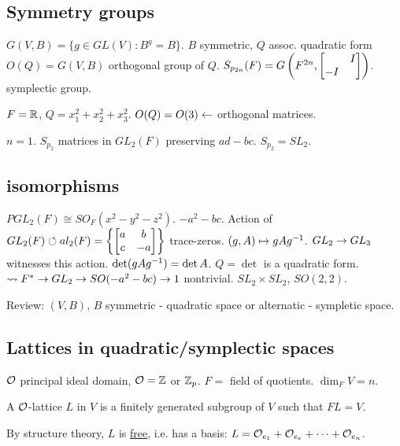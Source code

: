 \documentclass[]{article}
\begin{document}
\subsection*{Symmetry groups}

$G(V,B) = \{g\in GL(V): B^g = B\}$. $B$ symmetric, $Q$ assoc. quadratic form $O(Q) = G(V,B)$ orthogonal group of $Q$. $S_{p_{2n}}(F) = G\left(F^{2n},\begin{bmatrix}&I\\-I&\end{bmatrix}\right)$. symplectic group.

\begin{example}
	$F = \mathbb{R}$, $Q = x_1^2 + x_2^2 + x_3^2$. $O(Q) = O(3) \leftarrow$ orthogonal matrices.
\end{example}
\begin{example}
	$n = 1$. $S_{p_2}$ matrices in $GL_2(F)$ preserving $ad-bc$. $S_{p_2} = SL_2$.
\end{example}
\subsection*{ isomorphisms}

$PGL_2(F) \cong SO_F(x^2-y^2-z^2)$. $-a^2-bc$. Action of $GL_2(F) \circlearrowleft al_2(F) = \left\{\begin{bmatrix}a&b\\c&-a\end{bmatrix}\right\}$ trace-zeros. $(g,A) \mapsto gAg^{-1}$. $GL_2\rightarrow GL_3$ witnesses this action. $\det(gAg^{-1}) = \det A$. $Q = \det$ is a quadratic form. $\rightsquigarrow F^* \rightarrow GL_2 \rightarrow SO(-a^2-bc) \rightarrow 1$ nontrivial.
$SL_2\times SL_2$, $SO(2,2)$.


Review: $(V,B)$, $B$ symmetric - quadratic space or alternatic - sympletic space.

\subsection*{Lattices in quadratic/symplectic spaces}

$\mathcal{O}$ principal ideal domain, $\mathcal{O} = \mathbb{Z}$ or $\mathbb{Z}_p$. $F = $ field of quotients. $\dim_F V = n$.

\begin{definition}
	A $\mathcal{O}$-lattice $L$ in $V$ is a finitely generated subgroup of $V$ such that $FL = V$.
\end{definition}

\begin{remark}
	By structure theory, $L$ is \ul{free}, i.e. has a basis: $L = \mathcal{O}_{e_1}+\mathcal{O}_{e_e} + \dots + \mathcal{O}_{e_n}$.
\end{remark}
\end{document}
